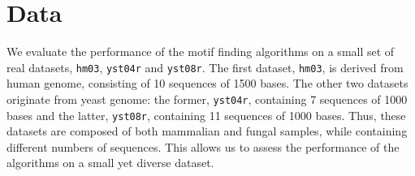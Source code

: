\section{Data}

We evaluate the performance of the motif finding algorithms on a small set of real datasets, \texttt{hm03}, \texttt{yst04r} and \texttt{yst08r}. The first dataset, \texttt{hm03}, is derived from human genome, consisting of 10 sequences of 1500 bases. The other two datasets originate from yeast genome: the former, \texttt{yst04r}, containing 7 sequences of 1000 bases and the latter, \texttt{yst08r}, containing 11 sequences of 1000 bases. Thus, these datasets are composed of both mammalian and fungal samples, while containing different numbers of sequences. This allows us to assess the performance of the algorithms on a small yet diverse dataset.